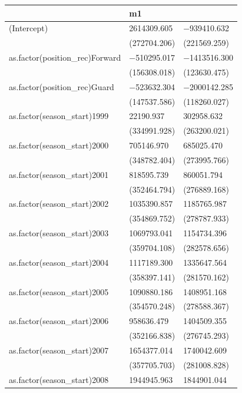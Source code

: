 \documentclass[
]{book}
\begin{document}
\begin{table}
\centering
\begin{tabular}[t]{lll}
\toprule
  & m1 &   \\
\midrule
(Intercept) & \num{2614309.605} & \num{-939410.632}\\
 & (\num{272704.206}) & (\num{221569.259})\\
as.factor(position\_rec)Forward & \num{-510295.017} & \num{-1413516.300}\\
 & (\num{156308.018}) & (\num{123630.475})\\
as.factor(position\_rec)Guard & \num{-523632.304} & \num{-2000142.285}\\
 & (\num{147537.586}) & (\num{118260.027})\\
as.factor(season\_start)1999 & \num{22190.937} & \num{302958.632}\\
 & (\num{334991.928}) & (\num{263200.021})\\
as.factor(season\_start)2000 & \num{705146.970} & \num{685025.470}\\
 & (\num{348782.404}) & (\num{273995.766})\\
as.factor(season\_start)2001 & \num{818595.739} & \num{860051.794}\\
 & (\num{352464.794}) & (\num{276889.168})\\
as.factor(season\_start)2002 & \num{1035390.857} & \num{1185765.987}\\
 & (\num{354869.752}) & (\num{278787.933})\\
as.factor(season\_start)2003 & \num{1069793.041} & \num{1154734.396}\\
 & (\num{359704.108}) & (\num{282578.656})\\
as.factor(season\_start)2004 & \num{1117189.300} & \num{1335647.564}\\
 & (\num{358397.141}) & (\num{281570.162})\\
as.factor(season\_start)2005 & \num{1090880.186} & \num{1408951.168}\\
 & (\num{354570.248}) & (\num{278588.367})\\
as.factor(season\_start)2006 & \num{958636.479} & \num{1404509.355}\\
 & (\num{352166.838}) & (\num{276745.293})\\
as.factor(season\_start)2007 & \num{1654377.014} & \num{1740042.609}\\
 & (\num{357705.703}) & (\num{281008.828})\\
as.factor(season\_start)2008 & \num{1944945.963} & \num{1844901.044}\\

\end{tabular}
\end{table}
\end{document}
